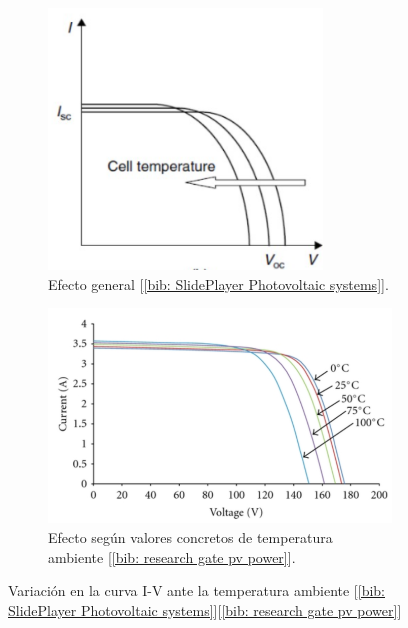 \documentclass[12pt]{article}
\begin{document}
	\begin{figure}[h!]
		\begin{subfigure}{0.45\textwidth}
			\includegraphics[width=0.8\textwidth]{img/generalEffect_celTempIVcurve_solarCell.png} 
			\caption{Efecto general [\ref{bib: SlidePlayer Photovoltaic systems}].}
			\label{fig: variación general en la curva I-V de una célula PV con la temperatura.}
		\end{subfigure}
		\begin{subfigure}{0.55\textwidth}
			\includegraphics[width=1\linewidth]{img/concreteEffect_TempIVcurve_solarCell.png}
			\caption{Efecto según valores concretos de temperatura ambiente [\ref{bib: research gate pv power}].}
			\label{fig:variación con valores en la curva I-V de una célula PV con la temperatura.}
		\end{subfigure}
		\caption{Variación en la curva I-V ante la temperatura ambiente [\ref{bib: SlidePlayer Photovoltaic systems}][\ref{bib: research gate pv power}]}
		\label{fig:variación I-V temperatura}
	\end{figure}
	
\end{document}
